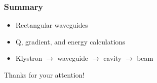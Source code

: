 \documentclass[professionalfonts,t]{beamer}
\begin{document}
\begin{frame}
	\frametitle{Summary}
	\begin{itemize}
		\item Rectangular waveguides
		\item Q, gradient, and energy calculations
		\item Klystron $\rightarrow$ waveguide $\rightarrow$ cavity $\rightarrow$ beam
	\end{itemize}

\vspace{1em}

	\centering
	\large{Thanks for your attention!}
\end{frame}
\fi
\end{document}
